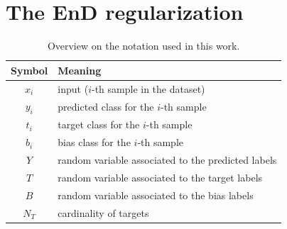 \section{The EnD regularization}
\label{sec:supervised-end}



\begin{table}
   \center
    \caption{Overview on the notation used in this work.}
    \begin{tabular}{c l}%
        \toprule
        \textbf{Symbol} & \textbf{Meaning}\\
        \midrule
        $x_i$      & input ($i$-th sample in the dataset)\\
        $y_i$      & predicted class for the $i$-th sample \\
        $t_i$      & target class for the $i$-th sample \\
        $b_i$      & bias class for the $i$-th sample \\
        
        $Y$        & random variable associated to the predicted labels\\
        $T$        & random variable associated to the target labels\\
        $B$        & random variable associated to the bias labels\\
        $N_T$                     & cardinality of targets\\
        
        
        
        
        
        
      
        
        \bottomrule
    \end{tabular}
    \label{tab:notationover}
\end{table}

